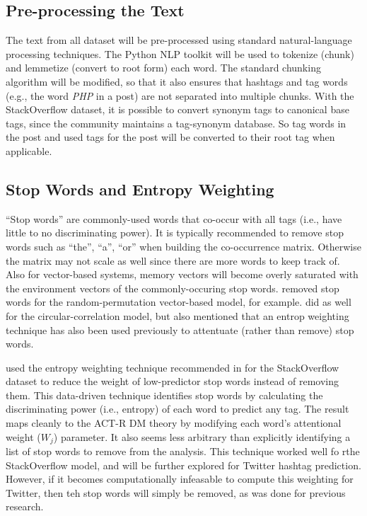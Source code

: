 \documentclass[man,floatsintext]{apa6}
\begin{document}

\subsection{Pre-processing the Text}

The text from all dataset will be pre-processed using standard natural-language processing techniques.
The Python NLP toolkit \parencite{Bird2009} will be used to tokenize (chunk) and lemmetize (convert to root form) each word.
The standard chunking algorithm will be modified, so that it also ensures that hashtags and tag words (e.g., the word \emph{PHP} in a post) are not separated into multiple chunks.
With the StackOverflow dataset, it is possible to convert synonym tags to canonical base tags, since the community maintains a tag-synonym database.
So tag words in the post and used tags for the post will be converted to their root tag when applicable.

\subsection{Stop Words and Entropy Weighting}

``Stop words'' are commonly-used words that co-occur with all tags (i.e., have little to no discriminating power).
It is typically recommended \parencite{Bird2009} to remove stop words such as ``the'', ``a'', ``or'' when building the co-occurrence matrix.
Otherwise the matrix may not scale as well since there are more words to keep track of. 
Also for vector-based systems, memory vectors will become overly saturated with the environment vectors of the commonly-occuring stop words.
\textcite{Sahlgren2008} removed stop words for the random-permutation vector-based model, for example.
\textcite{Jones2007} did as well for the circular-correlation model, but also mentioned that an entrop weighting technique has also been used previously to attentuate (rather than remove) stop words.

\textcite{Stanley2013} used the entropy weighting technique recommended in \textcite{Dumais1991} for the StackOverflow dataset to reduce the weight of low-predictor stop words instead of removing them.
This data-driven technique identifies stop words by calculating the discriminating power (i.e., entropy) of each word to predict any tag.
The result maps cleanly to the ACT-R DM theory by modifying each word's attentional weight ($W_{j}$) parameter.
It also seems less arbitrary than explicitly identifying a list of stop words to remove from the analysis.
This technique worked well fo rthe StackOverflow model, and will be further explored for Twitter hashtag prediction.
However, if it becomes computationally infeasable to compute this weighting for Twitter, then teh stop words will simply be removed, as was done for previous research.
\end{document}
